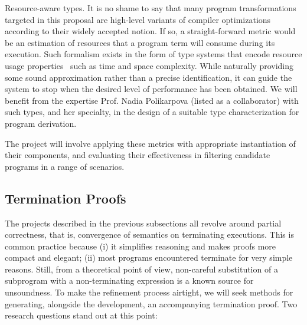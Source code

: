 \begin{paragraph}{Resource-aware types.}
It is no shame to say that many program transformations targeted in this
proposal are high-level variants of compiler optimizations according to their widely
accepted notion.
If so, a straight-forward metric would be an estimation of resources
that a program term will consume during its execution.
Such formalism exists in the form of type systems that encode resource
usage properties~\cite{CAV2012/Hoffman} such as time and space complexity.
While naturally providing some sound approximation rather than a precise
identification, it can guide the system to stop when the desired level
of performance has been obtained.
We will benefit from the expertise Prof. Nadia Polikarpova (listed as a collaborator) with such types, 
and her specialty, in the design of a suitable type characterization for program derivation.
\end{paragraph}

\bigskip
The project will involve applying these metrics with appropriate 
instantiation of their components, and evaluating their effectiveness
in filtering candidate programs in a range of scenarios.

\subsection{Termination Proofs}

The projects described in the previous subsections all revolve around partial
correctness, that is, convergence of semantics on terminating executions.
This is common practice because
(i) it simplifies reasoning and makes proofs more compact and elegant;
(ii) most programs encountered terminate for very simple reasons.
Still, from a theoretical point of view, non-careful substitution of a subprogram
with a non-terminating expression is a known source for unsoundness.
To make the refinement process airtight, we will seek methods for generating,
alongside the development, an accompanying termination proof.
Two research questions stand out at this point:


